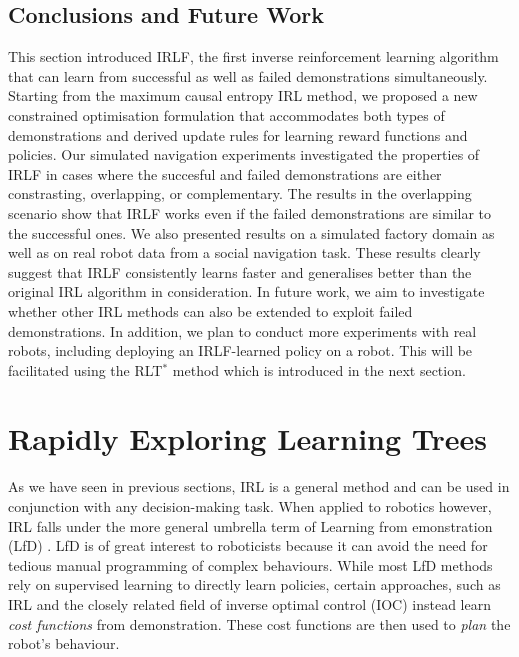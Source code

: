 \documentclass[a4paper,11pt]{report}
\begin{document}
\subsection{Conclusions and Future Work}


This section introduced IRLF, the first inverse reinforcement learning algorithm that can learn from successful as well as failed demonstrations simultaneously. Starting from the maximum causal entropy IRL method, we proposed a new constrained optimisation formulation that accommodates both types of demonstrations and derived update rules for learning reward functions and policies. Our simulated navigation experiments investigated the properties of IRLF in cases where the succesful and failed demonstrations are either constrasting, overlapping, or complementary. The results in the overlapping scenario show that IRLF works even if the failed demonstrations are similar to the successful ones. We also presented results on a simulated factory domain as well as on real robot data from a social navigation task. These results clearly suggest that IRLF consistently learns faster and generalises better than the original IRL algorithm in consideration. In future work, we aim to investigate whether other IRL methods can also be extended to exploit failed demonstrations. In addition, we plan to conduct more experiments with real robots, including deploying an IRLF-learned policy on a robot. This will be facilitated using the RLT$^*$ method which is introduced in the next section.
\pagebreak


\section{Rapidly Exploring Learning Trees}
\label{sec:rrt-iros}
As we have seen in previous sections, IRL is a general method and can be used in conjunction with any decision-making task. When applied to robotics however, IRL falls under the more general umbrella term of Learning from emonstration (LfD) \cite{argall2009survey}. LfD is of great interest to roboticists because it can avoid the need for tedious manual programming of complex behaviours. While most LfD methods rely on supervised learning to directly learn policies, certain approaches, such as IRL and the closely related field of inverse optimal control (IOC) \cite{kalman1964linear} instead learn \emph{cost functions} from demonstration. These cost functions are then used to \emph{plan} the robot's behaviour. 
\end{document}
